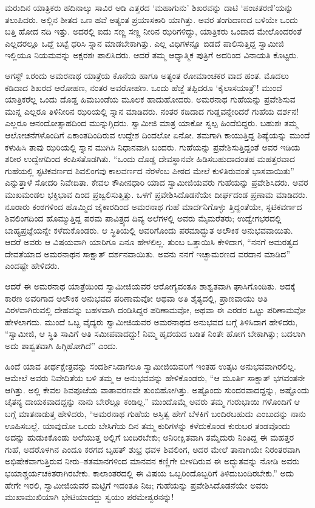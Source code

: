 ಮರುದಿನ ಯಾತ್ರಿಕರು ಹದಿನಾಲ್ಕು ಸಾವಿರ ಅಡಿ ಎತ್ತರದ ‘ಮಹಾಗುನು’ ಶಿಖರವನ್ನು ದಾಟಿ ‘ಪಂಚತರಣಿ’ಯನ್ನು ತಲುಪಿದರು. ಅಲ್ಲಿನ ಶೀತದ ಒಣ ಹವೆ ಅತ್ಯಂತ ಪ್ರಯಾಸಕಾರಿ ಯಾಗಿತ್ತು. ಅವರ ತಂಗುದಾಣದ ಬಳಿಯೇ ಒಂದು ಬತ್ತಿ ಹೋದ ನದಿ ಇತ್ತು. ಅದರಲ್ಲಿ ಐದು ಸಣ್ಣ ಸಣ್ಣ ನೀರಿನ ಝರಿಗಳಿದ್ದು, ಯಾತ್ರಿಕರು ಒಂದಾದ ಮೇಲೊಂದರಂತೆ ಎಲ್ಲದರಲ್ಲೂ ಒದ್ದೆ ಬಟ್ಟೆ ಧರಿಸಿ ಸ್ನಾನ ಮಾಡಬೇಕಾಗಿತ್ತು. ಎಲ್ಲ ವಿಧಿಗಳನ್ನೂ ಬಿಡದೆ ಪಾಲಿಸುತ್ತಿದ್ದ ಸ್ವಾಮೀಜಿ ಇಲ್ಲಿಯೂ ನಿಯಮವನ್ನು ಅಕ್ಷರಶಃ ಪಾಲಿಸಿದರು. ಆದರೆ ತಮ್ಮ ಆಧ್ಯಾತ್ಮಿಕ ಪುತ್ರಿಗೆ ಅದರಿಂದ ವಿನಾಯತಿ ಕೊಟ್ಟರು.

ಆಗಸ್ಟ್ ೩ರಂದು ಅಮರನಾಥ ಯಾತ್ರೆಯ ಕೊನೆಯ ಹಾಗೂ ಅತ್ಯಂತ ರೋಮಾಂಚಕರ ವಾದ ಹಂತ. ಮೊದಲು ಕಡಿದಾದ ಶಿಖರದ ಆರೋಹಣ, ನಂತರ ಅವರೋಹಣ. ಒಂದು ಹೆಜ್ಜೆ ತಪ್ಪಿದರೂ ‘ಕೈಲಾಸಯಾತ್ರೆ’! ಮುಂದೆ ಯಾತ್ರಿಕರೆಲ್ಲ ಒಂದು ದೊಡ್ಡ ಹಿಮಬಂಡೆಯ ಮೂಲಕ ಹಾದುಹೋದರು. ಅಮರನಾಥ ಗುಹೆಯನ್ನು ಪ್ರವೇಶಿಸುವ ಮುನ್ನ ಎಲ್ಲರೂ ತಿಳಿನೀರಿನ ಝರಿಯಲ್ಲಿ ಸ್ನಾನ ಮಾಡಿದರು. ನಂತರ ಕಡಿದಾದ ಗುಡ್ಡವನ್ನೇರಿದರೆ ಗುಹೆಯ ದರ್ಶನ! ಎಲ್ಲರೂ ಆನಂದೋತ್ಸಾಹದಿಂದ ಮುನ್ನುಗ್ಗಿದರು. ಸ್ವಾಮೀಜಿ ಮಾತ್ರ ಯಾಕೋ ಸ್ವಲ್ಪ ಹಿಂದೆಬಿದ್ದರು. ಬಹುಶಃ ತಮ್ಮ ಆಲೋಚನೆಗಳೊಂದಿಗೆ ಏಕಾಂತದಿಂದಿರುವ ಉದ್ದೇಶ ದಿಂದಲೋ ಏನೋ. ತಮಗಾಗಿ ಕಾಯುತ್ತಿದ್ದ ಶಿಷ್ಯೆಯನ್ನು ಮುಂದೆ ಕಳುಹಿಸಿ ತಾವು ಝರಿಯಲ್ಲಿ ಸ್ನಾನ ಮುಗಿಸಿ ನಿಧಾನವಾಗಿ ಬಂದರು. ಗುಹೆಯನ್ನು ಪ್ರವೇಶಿಸುತ್ತಿದ್ದಂತೆ ಅವರ ಇಡಿಯ ಶರೀರ ಉದ್ವೇಗದಿಂದ ಕಂಪಿಸತೊಡಗಿತು. “ಒಂದು ದೊಡ್ಡ ದೇವಸ್ಥಾನವೇ ಹಿಡಿಸಬಹುದಾದಂತಹ ಮಹತ್ತರವಾದ ಗುಹೆಯಲ್ಲಿ ಸ್ಫಟಿಕವರ್ಣದ ಶಿವಲಿಂಗವು ಕಾಲವರ್ಣದ ನೆರಳೆಂಬ ಪೀಠದ ಮೇಲೆ ಕುಳಿತಿರುವಂತೆ ಭಾಸವಾಯಿತು” ಎನ್ನುತ್ತಾಳೆ ಸೋದರಿ ನಿವೇದಿತಾ. ಕೇವಲ ಕೌಪೀನಧಾರಿ ಯಾದ ಸ್ವಾಮೀಜಿಯವರು ಗುಹೆಯನ್ನು ಪ್ರವೇಶಿಸಿದರು. ಅವರ ಮುಖಮಂಡಲ ಭಕ್ತಿಭಾವ ದಿಂದ ಪ್ರಜ್ವಲಿಸುತ್ತಿತ್ತು. ಒಳಗೆ ಪ್ರವೇಶಿಸಿದೊಡನೆಯೇ ದೀರ್ಘದಂಡ ಪ್ರಣಾಮ ಮಾಡಿದರು. ನೂರಾರು ಕಂಠಗಳಿಂದ ಹೊಮ್ಮಿದ ಜೈಕಾರದಿಂದ ಅಮರನಾಥ ಗುಹೆ ಮಾರ್ದನಿಗೊಳ್ಳು ತ್ತಿದ್ದಂತೆಯೇ, ಸ್ಫಟಿಕವರ್ಣದ ಶಿವಲಿಂಗದಿಂದ ಹೊಮ್ಮುತ್ತಿದ್ದ ಪರಮ ಪಾವಿತ್ರ್ಯದ ದಿವ್ಯ ಅಲೆಗಳಲ್ಲಿ ಅವರು ಮೈಮರೆತರು; ಉದ್ವೇಗಭರದಲ್ಲಿ ಬಾಹ್ಯಪ್ರಜ್ಞೆಯನ್ನೇ ಕಳೆದುಕೊಂಡರು. ಆ ಸ್ಥಿತಿಯಲ್ಲಿ ಅವರಿಗೊಂದು ಪರಮಾದ್ಭುತ ಅಲೌಕಿಕ ಅನುಭವವಾಯಿತು. ಆದರೆ ಅವರು ಆ ವಿಷಯವಾಗಿ ಯಾರಿಗೂ ಏನೂ ಹೇಳಲಿಲ್ಲ. ತುಂಬ ಒತ್ತಾಯಿಸಿ ಕೇಳಿದಾಗ, “ನನಗೆ ಅಮರತ್ವದ ದೇವತೆಯಾದ ಅಮರನಾಥನ ಸಾಕ್ಷಾತ್ ದರ್ಶನವಾಯಿತು. ಅವನು ನನಗೆ ಇಚ್ಛಾಮರಣದ ವರದಾನ ಮಾಡಿದ” ಎಂದಷ್ಟೇ ಹೇಳಿದರು.

ಆದರೆ ಈ ಅಮರನಾಥ ಯಾತ್ರೆಯಿಂದ ಸ್ವಾಮೀಜಿಯವರ ಆರೋಗ್ಯವಂತೂ ಶಾಶ್ವತವಾಗಿ ಘಾಸಿಗೊಂಡಿತು. ಅದಕ್ಕೆ ಕಾರಣ ಅವರಿಗಾದ ಅಲೌಕಿಕ ಅನುಭವದ ಪರಿಣಾಮವೋ ಅಥವಾ ಅತಿ ಶೈತ್ಯದಲ್ಲಿ, ಪ್ರಾಣವಾಯು ಅತಿ ವಿರಳವಾಗಿರುವಲ್ಲಿ ದೇಹವನ್ನು ಬಹಳವಾಗಿ ದಂಡಿಸಿದ್ದರ ಪರಿಣಾಮವೋ, ಅಥವಾ ಈ ಎರಡರ ಒಟ್ಟು ಪರಿಣಾಮವೋ ಹೇಳಲಾಗದು. ಮುಂದೆ ಒಬ್ಬ ವೈದ್ಯರು ಸ್ವಾಮೀಜಿಯವರ ಅಮರನಾಥದ ಅನುಭವದ ಬಗ್ಗೆ ತಿಳಿಸಿದಾಗ ಹೇಳಿದರು, “ಸ್ವಾಮೀಜಿ, ಆ ಸ್ಥಿತಿ ಸಾವಿಗೆ ಅತಿ ಸಮೀಪವಾದದ್ದು! ನಿಮ್ಮ ಹೃದಯದ ಬಡಿತ ನಿಂತೇ ಹೋಗ ಬೇಕಾಗಿತ್ತು; ಬದಲಾಗಿ ಅದು ಶಾಶ್ವತವಾಗಿ ಹಿಗ್ಗಿಹೋಗಿದೆ” ಎಂದು.

ಹಿಂದೆ ಯಾವ ತೀರ್ಥಕ್ಷೇತ್ರವನ್ನು ಸಂದರ್ಶಿಸಿದಾಗಲೂ ಸ್ವಾಮೀಜಿಯವರಿಗೆ ಇಂತಹ ಉತ್ಕಟ ಅನುಭವವಾಗಿರಲಿಲ್ಲ. ಆಮೇಲೆ ಅವರು ನಿವೇದಿತೆಯ ಬಳಿ ತಮ್ಮ ಆ ಅನುಭವವನ್ನು ಹೇಳಿಕೊಂಡರು, “ಆ ಮೂರ್ತಿ ಸಾಕ್ಷಾತ್ ಭಗವಂತನೇ ಆಗಿತ್ತು. ಅಲ್ಲಿ ಕೇವಲ ಶಿವಪೂಜೆಯ ವಾತಾವರಣವೇ ತುಂಬಿಹೋಗಿತ್ತು. ಅಷ್ಟೊಂದು ಸುಂದರವಾದದ್ದನ್ನು, ಅಷ್ಟೊಂದು ಚೈತನ್ಯ ದಾಯಕವಾದದ್ದನ್ನು ನಾನು ಬೇರೆಲ್ಲೂ ಕಂಡಿಲ್ಲ.” ಮುಂದೊಮ್ಮೆ ಅವರು ತಮ್ಮ ಗುರುಭಾಯಿ ಗಳೊಂದಿಗೆ ಆ ಬಗ್ಗೆ ಮಾತನಾಡುತ್ತ ಹೇಳಿದರು, “ಅಮರನಾಥ ಗುಹೆಯ ಅಸ್ತಿತ್ವ ಹೇಗೆ ಬೆಳಕಿಗೆ ಬಂದಿರಬಹುದು ಎಂಬುದನ್ನು ನಾನು ಊಹಿಸಬಲ್ಲೆ. ಯಾವುದೋ ಒಂದು ಬೇಸಿಗೆಯ ದಿನ ತಮ್ಮ ಕುರಿಗಳನ್ನು ಕಳೆದುಕೊಂಡ ಕುರುಬರ ತಂಡವೊಂದು ಅದನ್ನು ಹುಡುಕಿಕೊಂಡು ಅಲೆಯುತ್ತ ಅಲ್ಲಿಗೆ ಬಂದಿರಬೇಕು; ಅನಿರೀಕ್ಷಿತವಾಗಿ ತಮ್ಮೆದುರು ನಿಂತಿದ್ದ ಈ ಮಹತ್ತರ ಗುಹೆ, ಅದರೊಳಗಿನ ಎಂದೂ ಕರಗದ ಬೃಹತ್ ಶುಭ್ರ ಧವಳ ಶಿವಲಿಂಗ, ಅದರ ಮೇಲೆ ತಾನಾಗಿಯೇ ನಿರಂತರವಾಗಿ ಅಭಿಷೇಕವಾಗುತ್ತಿರುವ ನೀರು–ಶತಮಾನಗಳಿಂದ ಮಾನವನ ಕಣ್ಣಿಗೇ ಬೀಳದಿರುವ ಈ ಅದ್ಭುತವನ್ನು ನೋಡಿ ಅವರು ಭಯಾಶ್ಚರ್ಯಚಕಿತರಾಗಿರಬೇಕು. ಕಾಲಾಂತರದಲ್ಲಿ ಈ ವಿಷಯ ಒಬ್ಬರಿಂದೊಬ್ಬರಿಗೆ ತಿಳಿದುಬಂದಿರಬೇಕು.” ಅದು ಹೇಗೇ ಇರಲಿ, ಸ್ವಾಮೀಜಿಯವರ ಮಟ್ಟಿಗೆ ಇದಂತೂ ನಿಜ; ಗುಹೆಯನ್ನು ಪ್ರವೇಶಿಸಿದೊಡನೆಯೇ ಅವರು ಮುಖಾಮುಖಿಯಾಗಿ ಭೇಟಿಯಾದದ್ದು ಸ್ವಯಂ ಪರಮೇಶ್ವರನನ್ನು!

